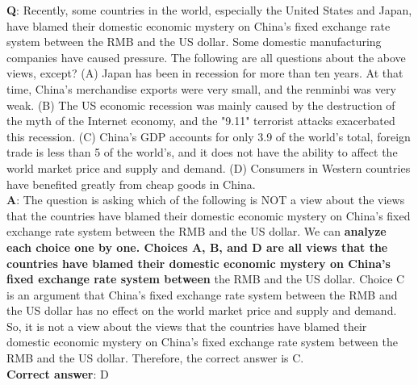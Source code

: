 \begin{tcolorbox}[colback=blue!5!white,colframe=blue!75!black,title=LogiQA example (\llamainstruct)]
\textbf{Q}: Recently, some countries in the world, especially the United States and Japan, have blamed their domestic economic mystery on China's fixed exchange rate system between the RMB and the US dollar. Some domestic manufacturing companies have caused pressure. The following are all questions about the above views, except? (A) Japan has been in recession for more than ten years. At that time, China's merchandise exports were very small, and the renminbi was very weak. (B) The US economic recession was mainly caused by the destruction of the myth of the Internet economy, and the "9.11" terrorist attacks exacerbated this recession. (C) China's GDP accounts for only 3.9 of the world's total, foreign trade is less than 5 of the world's, and it does not have the ability to affect the world market price and supply and demand. (D) Consumers in Western countries have benefited greatly from cheap goods in China.\\

\textbf{A}: The question is asking which of the following is NOT a view about the views that the countries have blamed their domestic economic mystery on China's fixed exchange rate system between the RMB and the US dollar. We can \textbf{analyze each choice one by one. Choices A, B, and D are all views that the countries have blamed their domestic economic mystery on China's fixed exchange rate system between} the RMB and the US dollar. Choice C is an argument that China's fixed exchange rate system between the RMB and the US dollar has no effect on the world market price and supply and demand. So, it is not a view about the views that the countries have blamed their domestic economic mystery on China's fixed exchange rate system between the RMB and the US dollar. Therefore, the correct answer is C.\\

\textbf{Correct answer}: D
\end{tcolorbox}


